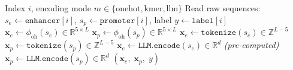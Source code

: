 \begin{algorithm}[H]
\caption{EPIDataset \texttt{\_\_getitem\_\_}}\label{alg:dataset}
\begin{algorithmic}[1]
\Require Index $i$, encoding mode $m \in \{\text{onehot}, \text{kmer}, \text{llm}\}$
\State Read raw sequences: $s_e \leftarrow \texttt{enhancer}[i]$,
       $s_p \leftarrow \texttt{promoter}[i]$, label $y \leftarrow \texttt{label}[i]$
  \State $\mathbf{x}_e \leftarrow \phi_{\mathrm{oh}}(s_e) \in \mathbb{R}^{5 \times L}$
  \State $\mathbf{x}_p \leftarrow \phi_{\mathrm{oh}}(s_p) \in \mathbb{R}^{5 \times L}$
  \State $\mathbf{x}_e \leftarrow \texttt{tokenize}(s_e) \in \mathbb{Z}^{L-5}$
  \State $\mathbf{x}_p \leftarrow \texttt{tokenize}(s_p) \in \mathbb{Z}^{L-5}$
  \State $\mathbf{x}_e \leftarrow \texttt{LLM.encode}(s_e) \in \mathbb{R}^{d}$ \quad\textit{(pre-computed)}
  \State $\mathbf{x}_p \leftarrow \texttt{LLM.encode}(s_p) \in \mathbb{R}^{d}$
\EndIf
\State \Return $(\mathbf{x}_e,\; \mathbf{x}_p,\; y)$
\end{algorithmic}
\end{algorithm}
